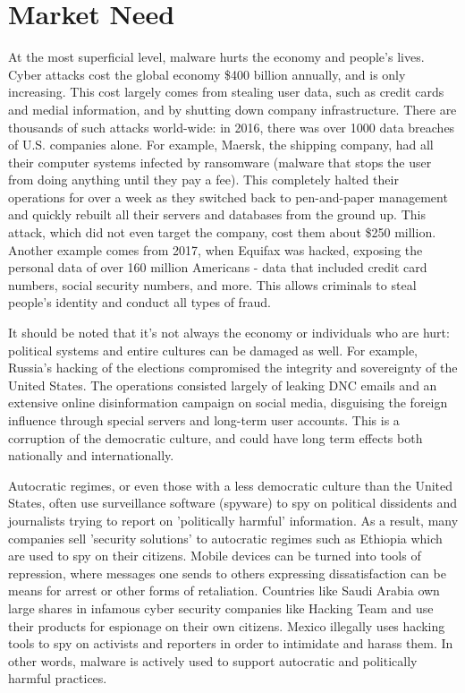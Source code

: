 \documentclass[openright]{report}
\begin{document}
\section{Market Need}

\par At the most superficial level, malware hurts the economy and people's lives. Cyber attacks cost the global economy \$400 billion annually, and is only increasing. This cost largely comes from stealing user data, such as credit cards and medial information, and by shutting down company infrastructure. There are thousands of such attacks world-wide: in 2016, there was over 1000 data breaches of U.S. companies alone. For example, Maersk, the shipping company, had all their computer systems infected by ransomware (malware that stops the user from doing anything until they pay a fee). This completely halted their operations for over a week as they switched back to pen-and-paper management and quickly rebuilt all their servers and databases from the ground up. This attack, which did not even target the company, cost them about \$250 million\cite{maersk}. Another example comes from 2017, when Equifax was hacked, exposing the personal data of over 160 million Americans - data that included credit card numbers, social security numbers, and more. This allows criminals to steal people's identity and conduct all types of fraud.

\par It should be noted that it's not always the economy or individuals who are hurt: political systems and entire cultures can be damaged as well. For example, Russia's hacking of the elections compromised the integrity and sovereignty of the United States\cite{russa_indicement}. The operations consisted largely of leaking DNC emails and an extensive online disinformation campaign on social media, disguising the foreign influence through special servers and long-term user accounts\cite{russa_indicement_nyt}\cite{what_russia_did}. This is a corruption of the democratic culture, and could have long term effects both nationally and internationally. 

\par Autocratic regimes, or even those with a less democratic culture than the United States, often use surveillance software (spyware) to spy on political dissidents and journalists trying to report on 'politically harmful' information. As a result, many companies sell 'security solutions' to autocratic regimes such as Ethiopia which are used to spy on their citizens\cite{ethiopia_surveillance}. Mobile devices can be turned into tools of repression, where messages one sends to others expressing dissatisfaction can be means for arrest or other forms of retaliation. Countries like Saudi Arabia own large shares in infamous cyber security companies like Hacking Team and use their products for espionage on their own citizens\cite{saudi_cyber}. Mexico illegally uses hacking tools to spy on activists and reporters in order to intimidate and harass them\cite{mexico_cyber}. In other words, malware is actively used to support autocratic and politically harmful practices.
\end{document}
